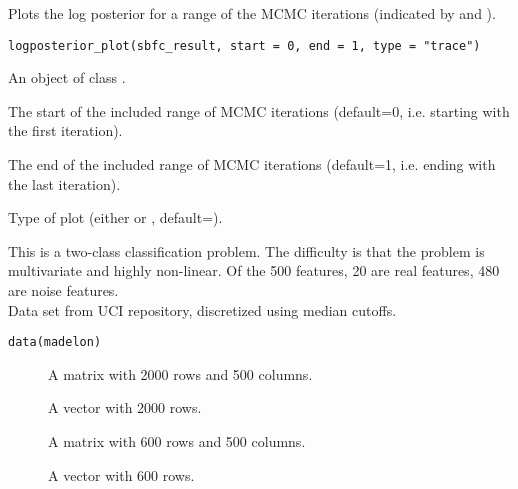 \documentclass[a4paper]{book}
\begin{document}
%
\begin{Description}\relax
Plots the log posterior for a range of the MCMC iterations (indicated by  and ).
\end{Description}
%
\begin{Usage}
\begin{verbatim}
logposterior_plot(sbfc_result, start = 0, end = 1, type = "trace")
\end{verbatim}
\end{Usage}
%
\begin{Arguments}
\begin{ldescription}
\item[\code{sbfc\_result}] An object of class .

\item[\code{start}] The start of the included range of MCMC iterations (default=0, i.e. starting with the first iteration).

\item[\code{end}] The end of the included range of MCMC iterations (default=1, i.e. ending with the last iteration).

\item[\code{type}] Type of plot (either  or , default=).
\end{ldescription}
\end{Arguments}
%
\begin{Description}\relax
This is a two-class classification problem. 
The difficulty is that the problem is multivariate and highly non-linear. 
Of the 500 features, 20 are real features, 480 are noise features. \\{}
Data set from UCI repository, discretized using median cutoffs.
\end{Description}
%
\begin{Usage}
\begin{verbatim}
data(madelon)
\end{verbatim}
\end{Usage}
%
\begin{Format}
\begin{description}

\item[] A matrix with 2000 rows and 500 columns.
\item[] A vector with 2000 rows.
\item[] A matrix with 600 rows and 500 columns.
\item[] A vector with 600 rows.

\end{description}
\end{Format}
\end{document}
